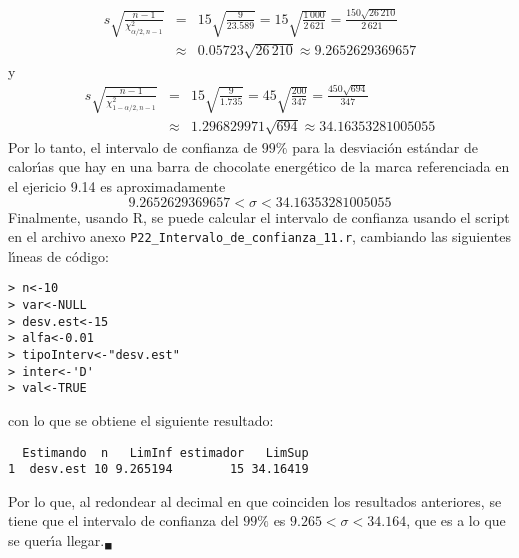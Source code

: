 \begin{solucion}
 \begin{eqnarray*}
  s\sqrt{\frac{n-1}{\chi^2_{\alpha/2,n-1}}} & = & 15\sqrt{\frac{9}{23.589}} = 15\sqrt{\frac{1\,000}{2\,621}} = \frac{150\sqrt{26\,210}}{2\,621} \\
  & \approx & 0.05723\sqrt{26\,210} \approx 
  9.2652629369657
 \end{eqnarray*}
 y
 \begin{eqnarray*}
  s\sqrt{\frac{n-1}{\chi^2_{1-\alpha/2,n-1}}} & = & 15\sqrt{\frac{9}{1.735}} = 45\sqrt{\frac{200}{347}} = \frac{450\sqrt{694}}{347} \\
  & \approx & 1.296829971\sqrt{694} \approx 34.16353281005055
 \end{eqnarray*}
 Por lo tanto, el intervalo de confianza de $99\%$ para la desviaci\'on est\'andar de calor\'{\i}as que hay en una barra de chocolate energ\'etico de la marca referenciada en el ejericio 9.14 es aproximadamente
 \begin{equation*}
  9.2652629369657 < \sigma < 34.16353281005055
 \end{equation*}
 Finalmente, usando R, se puede calcular el intervalo de confianza usando el script en el archivo anexo \texttt{P22\_Intervalo\_de\_confianza\_11.r}, cambiando las siguientes l\'{\i}neas de c\'odigo:
 \begin{verbatim}
> n<-10
> var<-NULL
> desv.est<-15
> alfa<-0.01
> tipoInterv<-"desv.est"
> inter<-'D'
> val<-TRUE
 \end{verbatim}
 \vspace{-0.5cm}
 con lo que se obtiene el siguiente resultado:
 \begin{verbatim}
  Estimando  n   LimInf estimador   LimSup
1  desv.est 10 9.265194        15 34.16419
 \end{verbatim}
 \vspace{-0.5cm}
 Por lo que, al redondear al decimal en que coinciden los resultados anteriores, se tiene que el intervalo de confianza del $99\%$ es $9.265 < \sigma < 34.164$, que es a lo que se quer\'{\i}a llegar.${}_{\blacksquare}$
\end{solucion}

